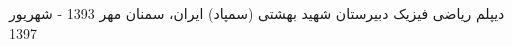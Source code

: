 \begin{cventries}
  \cventry
{دیپلم ریاضی فیزیک} %
{دبیرستان شهید بهشتی (سمپاد)} %
{ایران، سمنان} %
{مهر 1393 - شهریور 1397} %
{
	\begin{cvitems} %
	\end{cvitems}
}
\end{cventries}
